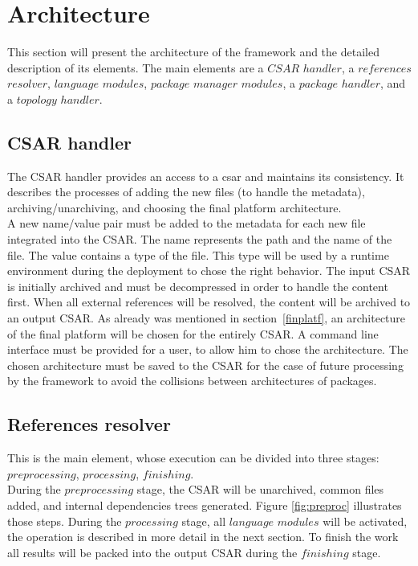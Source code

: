 \section{Architecture}\label{sec:arch}
This section will present the architecture of the framework and the detailed description of its elements.
The main elements are a \boldmath $CSAR$ $handler$, a $references$ $resolver$, $language$ $modules$, $package$ $manager$ $modules$, a $package$ $handler$, and a $topology$ $handler$. \unboldmath

\subsection{CSAR handler} \label{subs:casr_h}
The CSAR handler provides an access to a \gls{csar} and maintains its consistency. 
It describes the processes of adding the new files (to handle the metadata), archiving/unarchiving, and choosing the final platform architecture. \\
A new name/value pair must be added to the metadata for each new file integrated into the CSAR. 
The name represents the path and the name of the file.
The value contains a type of the file. 
This type will be used by a runtime environment during the deployment to chose the right behavior. %
The input CSAR is initially archived and must be decompressed in order to handle the content first.
When all external references will be resolved, the content will be archived to an output CSAR. %
As already was mentioned in section~\ref{finplatf}, an architecture of the final platform will be chosen for the entirely CSAR.
A command line interface must be provided for a user, to allow him to chose the architecture. 
The chosen architecture must be saved to the CSAR for the case of future processing by the framework to avoid the collisions between architectures of packages.

\subsection{References resolver} \label{subs:RR}
This is the main element, whose execution can be divided into three stages: $preprocessing$, $processing$, $finishing$. \\
During the $preprocessing$ stage, the CSAR will be unarchived, common files added, and internal dependencies trees generated.
Figure \ref{fig:preproc} illustrates those steps.
During the $processing$ stage, all $language$ $modules$ will be activated, the operation is described in more detail in the next section. %
To finish the work all results will be packed into the output CSAR during the $finishing$ stage.



